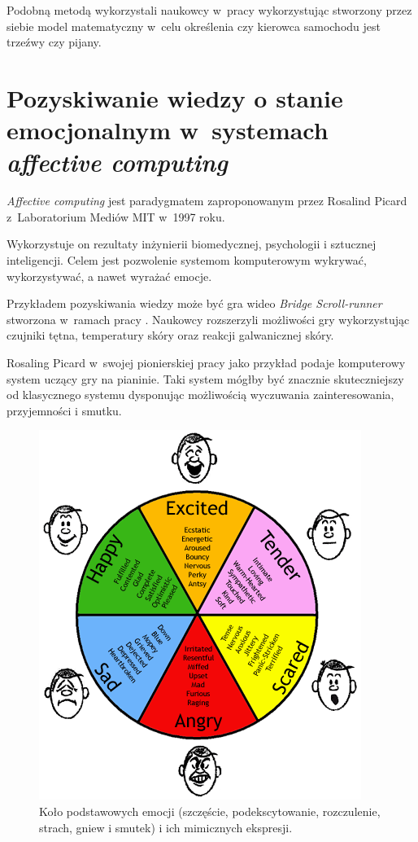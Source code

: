 Podobną metodą wykorzystali naukowcy w~pracy \cite{dai2010mobile} wykorzystując stworzony przez siebie model matematyczny w~celu określenia czy kierowca samochodu jest trzeźwy czy pijany.



\section{Pozyskiwanie wiedzy o stanie emocjonalnym w~systemach \textit{affective computing}}
\label{sec:pozyskiwanieWiedzyOStanieEmocjonalnymWSystemachAffectiveComputing}

\textit{Affective computing} jest paradygmatem zaproponowanym przez Rosalind Picard z~Laboratorium Mediów MIT w~1997 roku\cite{picard1997affective}.

Wykorzystuje on rezultaty inżynierii biomedycznej, psychologii i sztucznej inteligencji. Celem jest pozwolenie systemom komputerowym wykrywać, wykorzystywać, a nawet wyrażać emocje\cite{nalepa2017affective}.

Przykładem pozyskiwania wiedzy może być gra wideo \textit{Bridge Scroll-runner} stworzona w~ramach pracy \cite{nalepa2017affective}. Naukowcy rozszerzyli możliwości gry wykorzystując czujniki tętna, temperatury skóry oraz reakcji galwanicznej skóry.

Rosaling Picard w~swojej pionierskiej pracy \cite{picard1997affective} jako przykład podaje komputerowy system uczący gry na pianinie. Taki system mógłby być znacznie skuteczniejszy od klasycznego systemu dysponując możliwością wyczuwania zainteresowania, przyjemności i smutku.

\begin{figure}[H]
	\centering
	\includegraphics[scale=1]{rozdzial2/ModelEkmana.png}
	\caption{Koło podstawowych emocji (szczęście, podekscytowanie, rozczulenie, strach, gniew i smutek) i ich mimicznych ekspresji.}
\end{figure}

